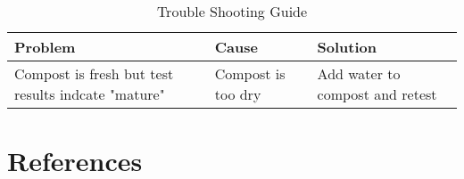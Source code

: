 \documentclass[12pt]{../SOP4_alpha}\usepackage[]{graphicx}\usepackage[]{xcolor}
\begin{document}
\begin{table}[ht]
\centering
\caption{Trouble Shooting Guide}
\begin{tabular}{p{5cm}p{5cm}p{5cm}} \hline
\textbf{Problem} & \textbf{Cause} & \textbf{Solution} \\ \hline \hline
Compost is fresh but test results indcate "mature"& 
Compost is too dry & 
Add water to compost and retest \\


\end{tabular}
\end{table}

\section{References}




\end{document}
